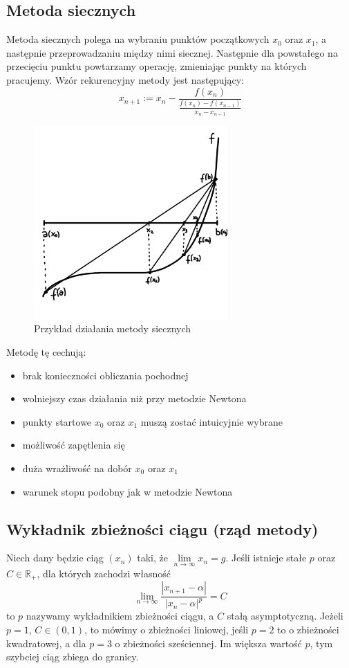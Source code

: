 \documentclass[a4paper,11pt]{article}
\begin{document}
\subsection{Metoda siecznych}
Metoda siecznych polega na wybraniu punktów początkowych $x_0$ oraz $x_1$, a następnie przeprowadzaniu między nimi siecznej. Następnie dla powstałego na przecięciu punktu powtarzamy operację, zmieniając punkty na których pracujemy. Wzór rekurencyjny metody jest następujący:
$$ x_{n+1} := x_n - \frac{f(x_n)}{\frac{f(x_n)-f(x_{n-1})}{x_n-x_{n-1}}}$$

\begin{figure}[H]
\centering
\includegraphics[width=0.66\textwidth]{metodasiecznych.png}
\caption{Przykład działania metody siecznych}
\label{metodasiecznych}
\end{figure}

Metodę tę cechują:
\begin{itemize}
\item brak konieczności obliczania pochodnej
\item wolniejszy czas działania niż przy metodzie Newtona
\item punkty startowe $x_0$ oraz $x_1$ muszą zostać intuicyjnie wybrane
\item możliwość zapętlenia się
\item duża wrażliwość na dobór $x_0$ oraz $x_1$
\item warunek stopu podobny jak w metodzie Newtona
\end{itemize}

\subsection{Wykładnik zbieżności ciągu (rząd metody)}
Niech dany będzie ciąg $(x_n)$ taki, że $\lim\limits_{n\to\infty} x_n=g$. Jeśli istnieje stałe $p$ oraz $C\in\mathbb{R}_{+}$, dla których zachodzi własność
$$ \lim\limits_{n\to\infty} \frac{\left| x_{n+1} - \alpha \right|}{\left| x_n - \alpha \right|^{p}} = C$$
to $p$ nazywamy wykładnikiem zbieżności ciągu, a $C$ stałą asymptotyczną. Jeżeli $p=1$, $C\in(0,1)$, to mówimy o zbieżności liniowej, jeśli $p=2$ to o zbieżności kwadratowej, a dla $p=3$ o zbieżności sześciennej. Im większa wartość $p$, tym szybciej ciąg zbiega do granicy.
\end{document}
